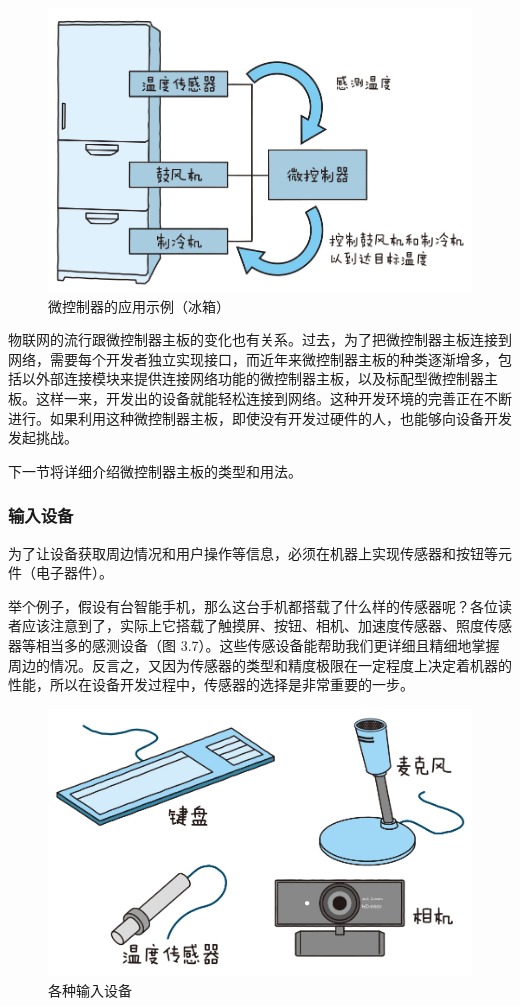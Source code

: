 \documentclass[12pt,UTF8]{ctexbook}
\begin{document}
\begin{figure}[htbp]
	\centering
	\includegraphics[width=1\linewidth]{57}
	\caption{微控制器的应用示例（冰箱）}
	\label{fig:1}
\end{figure}

物联网的流行跟微控制器主板的变化也有关系。过去，为了把微控制器主板连接到网络，需要每个开发者独立实现接口，而近年来微控制器主板的种类逐渐增多，包括以外部连接模块来提供连接网络功能的微控制器主板，以及标配型微控制器主板。这样一来，开发出的设备就能轻松连接到网络。这种开发环境的完善正在不断进行。如果利用这种微控制器主板，即使没有开发过硬件的人，也能够向设备开发发起挑战。

下一节将详细介绍微控制器主板的类型和用法。

\subsubsection{输入设备}

为了让设备获取周边情况和用户操作等信息，必须在机器上实现传感器和按钮等元件（电子器件）。

举个例子，假设有台智能手机，那么这台手机都搭载了什么样的传感器呢？各位读者应该注意到了，实际上它搭载了触摸屏、按钮、相机、加速度传感器、照度传感器等相当多的感测设备（图 3.7）。这些传感设备能帮助我们更详细且精细地掌握周边的情况。反言之，又因为传感器的类型和精度极限在一定程度上决定着机器的性能，所以在设备开发过程中，传感器的选择是非常重要的一步。

\begin{figure}[htbp]
	\centering
	\includegraphics[width=1\linewidth]{58}
	\caption{各种输入设备}
	\label{fig:1}
\end{figure}
\end{document}

